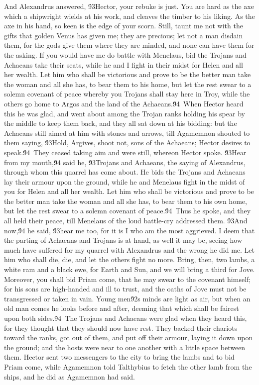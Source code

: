 {And Alexandrus answered, \'93Hector, your rebuke is just. You are hard as the axe which a shipwright wields at his work, and cleaves the timber to his liking. As the axe in his hand, so keen is the edge of your scorn. Still, taunt me not with the gifts that golden Venus has given me; they are precious; let not a man disdain them, for the gods give them where they are minded, and none can have them for the asking. If you would have me do battle with Menelaus, bid the Trojans and Achaeans take their seats, while he and I fight in their midst for Helen and all her wealth. Let him who shall be victorious and prove to be the better man take the woman and all she has, to bear them to his home, but let the rest swear to a solemn covenant of peace whereby you Trojans shall stay here in Troy, while the others go home to Argos and the land of the Achaeans.\'94\
When Hector heard this he was glad, and went about among the Trojan ranks holding his spear by the middle to keep them back, and they all sat down at his bidding: but the Achaeans still aimed at him with stones and arrows, till Agamemnon shouted to them saying, \'93Hold, Argives, shoot not, sons of the Achaeans; Hector desires to speak.\'94\
They ceased taking aim and were still, whereon Hector spoke. \'93Hear from my mouth,\'94 said he, \'93Trojans and Achaeans, the saying of Alexandrus, through whom this quarrel has come about. He bids the Trojans and Achaeans lay their armour upon the ground, while he and Menelaus fight in the midst of you for Helen and all her wealth. Let him who shall be victorious and prove to be the better man take the woman and all she has, to bear them to his own home, but let the rest swear to a solemn covenant of peace.\'94\
Thus he spoke, and they all held their peace, till Menelaus of the loud battle-cry addressed them. \'93And now,\'94 he said, \'93hear me too, for it is I who am the most aggrieved. I deem that the parting of Achaeans and Trojans is at hand, as well it may be, seeing how much have suffered for my quarrel with Alexandrus and the wrong he did me. Let him who shall die, die, and let the others fight no more. Bring, then, two lambs, a white ram and a black ewe, for Earth and Sun, and we will bring a third for Jove. Moreover, you shall bid Priam come, that he may swear to the covenant himself; for his sons are high-handed and ill to trust, and the oaths of Jove must not be transgressed or taken in vain. Young men\'92s minds are light as air, but when an old man comes he looks before and after, deeming that which shall be fairest upon both sides.\'94\
The Trojans and Achaeans were glad when they heard this, for they thought that they should now have rest. They backed their chariots toward the ranks, got out of them, and put off their armour, laying it down upon the ground; and the hosts were near to one another with a little space between them. Hector sent two messengers to the city to bring the lambs and to bid Priam come, while Agamemnon told Talthybius to fetch the other lamb from the ships, and he did as Agamemnon had said.\
}
